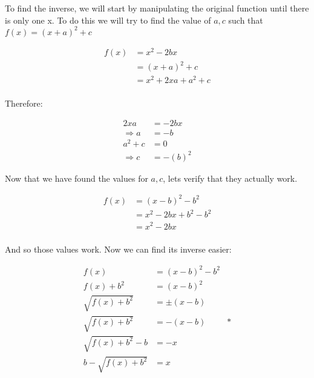 \documentclass[12pt]{article} %
\begin{document}
\begin{homeworkProblem}


    To find the inverse, we will start by manipulating the original function until
    there is only one x. To do this we will try to find the value of $a, c$ such that $f(x) = (x + a)^2 + c$

    \begin{align*}
        f(x) & = x^2 - 2bx           \\
             & = (x + a)^2 + c       \\
             & = x^2 + 2xa + a^2 + c \\
    \end{align*}

    Therefore:

    \begin{align*}
        2xa           & = -2bx   \\
        \Rightarrow a & = -b     \\
        a^2 + c       & = 0      \\
        \Rightarrow c & = -(b)^2
    \end{align*}

    Now that we have found the values for $a, c$, lets verify that they actually work.

    \begin{align*}
        f(x) & = (x - b)^2 - b^2       \\
             & = x^2 - 2bx + b^2 - b^2 \\
             & = x^2 - 2bx             \\
    \end{align*}

    And so those values work. Now we can find its inverse easier:

    \begin{align*}
        f(x)                  & = (x - b)^2 - b^2     \\
        f(x) + b^2            & = (x - b)^2           \\
        \sqrt{f(x) + b^2}     & = \pm (x - b)         \\
        \sqrt{f(x) + b^2}     & = - (x - b)       & * \\
        \sqrt{f(x) + b^2} - b & = - x                 \\
        b - \sqrt{f(x) + b^2} & = x                   \\
    \end{align*}


\end{homeworkProblem}
\end{document}
